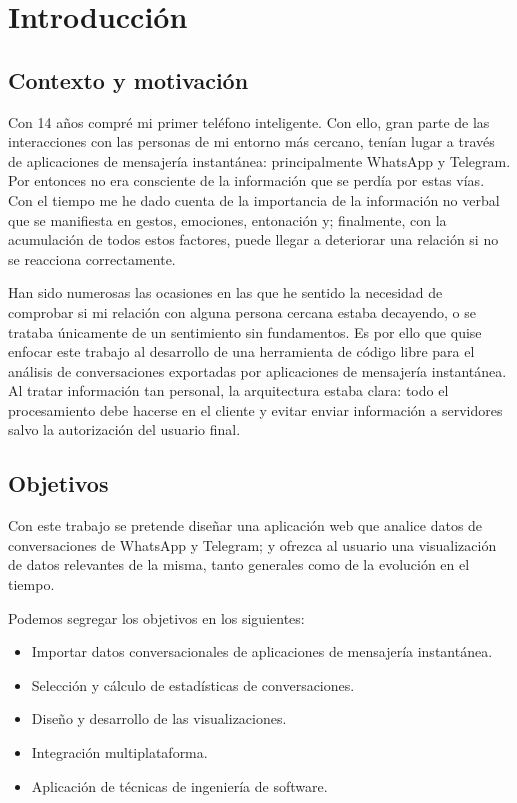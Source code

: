 \chapter{Introducción}
\label{chap:introduction}

\section{Contexto y motivación}
\label{sec:context}

Con 14 años compré mi primer teléfono inteligente. Con ello, gran parte de las interacciones con las personas de mi entorno más cercano, tenían lugar a través de aplicaciones de mensajería instantánea: principalmente WhatsApp y Telegram. Por entonces no era consciente de la información que se perdía por estas vías. Con el tiempo me he dado cuenta de la importancia de la información no verbal que se manifiesta en gestos, emociones, entonación y; finalmente, con la acumulación de todos estos factores, puede llegar a deteriorar una relación si no se reacciona correctamente.

Han sido numerosas las ocasiones en las que he sentido la necesidad de comprobar si mi relación con alguna persona cercana estaba decayendo, o se trataba únicamente de un sentimiento sin fundamentos. Es por ello que quise enfocar este trabajo al desarrollo de una herramienta de código libre para el análisis de conversaciones exportadas por aplicaciones de mensajería instantánea. Al tratar información tan personal, la arquitectura estaba clara: todo el procesamiento debe hacerse en el cliente y evitar enviar información a servidores salvo la autorización del usuario final.

\section{Objetivos}
\label{sec:project-goals}


Con este trabajo se pretende diseñar una aplicación web que analice datos de conversaciones de WhatsApp y Telegram; y ofrezca al usuario una visualización de datos relevantes de la misma, tanto generales como de la evolución en el tiempo.

Podemos segregar los objetivos en los siguientes:

\begin{itemize}

\item Importar datos conversacionales de aplicaciones de mensajería instantánea.
\item Selección y cálculo de estadísticas de conversaciones.
\item Diseño y desarrollo de las visualizaciones.
\item Integración multiplataforma.
\item Aplicación de técnicas de ingeniería de software.

\end{itemize}

